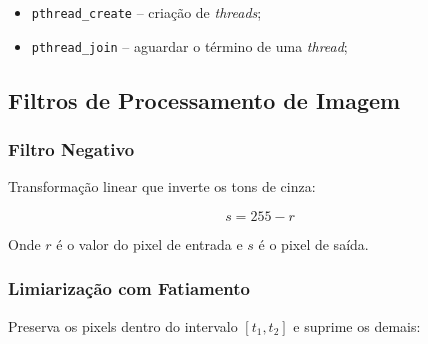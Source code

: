 \documentclass[12 pt]{abntex2}
\begin{document}
\begin{itemize}
  \item \texttt{pthread\_create} -- criação de \textit{threads};
  \item \texttt{pthread\_join} -- aguardar o término de uma \textit{thread};
\end{itemize}
 
 
 
 
\subsection{Filtros de Processamento de Imagem}
 
\subsubsection{Filtro Negativo}
 
Transformação linear que inverte os tons de cinza:
 
\begin{equation}
  s = 255 - r
  \label{eq:neg}
\end{equation}
 
Onde $r$ é o valor do pixel de entrada e $s$ é o pixel de saída.
 
\subsubsection{Limiarização com Fatiamento}
 
Preserva os pixels dentro do intervalo $[t_1, t_2]$ e suprime os demais:
 
\end{document}
